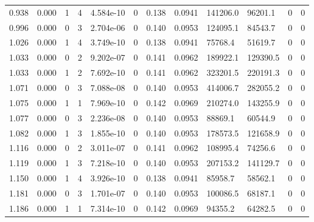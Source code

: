 \documentclass[preview]{standalone}
\begin{document}
{{\begin{tabular}{L{1.2cm}C{1.2cm} C{0.3cm}C{0.5cm} C{1.4cm}C{1.4cm} C{1.4cm}C{1.4cm} C{1.6cm}C{1.6cm} C{1.6cm}C{1.6cm}}
  0.938  &  0.000  & 1     &  4 &  4.584e-10  & 0  &  0.138&   0.0941& 141206.0 & 96201.1   &  0 & 0  \\ 
  0.996  &  0.000  & 0     &  3 &  2.704e-06  & 0  &  0.140&   0.0953& 124095.1 & 84543.7   &  0 & 0  \\ 
  1.026  &  0.000  & 1     &  4 &  3.749e-10  & 0  &  0.138&   0.0941& 75768.4 & 51619.7   &  0 & 0  \\ 
  1.033  &  0.000  & 0     &  2 &  9.202e-07  & 0  &  0.141&   0.0962& 189922.1 & 129390.5   &  0 & 0  \\ 
  1.033  &  0.000  & 1     &  2 &  7.692e-10  & 0  &  0.141&   0.0962& 323201.5 & 220191.3   &  0 & 0  \\ 
  1.071  &  0.000  & 0     &  3 &  7.088e-08  & 0  &  0.140&   0.0953& 414006.7 & 282055.2   &  0 & 0  \\ 
  1.075  &  0.000  & 1     &  1 &  7.969e-10  & 0  &  0.142&   0.0969& 210274.0 & 143255.9   &  0 & 0  \\ 
  1.077  &  0.000  & 0     &  3 &  2.236e-08  & 0  &  0.140&   0.0953& 88869.1 & 60544.9   &  0 & 0  \\ 
  1.082  &  0.000  & 1     &  3 &  1.855e-10  & 0  &  0.140&   0.0953& 178573.5 & 121658.9   &  0 & 0  \\ 
  1.116  &  0.000  & 0     &  2 &  3.011e-07  & 0  &  0.141&   0.0962& 108995.4 & 74256.6   &  0 & 0  \\ 
  1.119  &  0.000  & 1     &  3 &  7.218e-10  & 0  &  0.140&   0.0953& 207153.2 & 141129.7   &  0 & 0  \\ 
  1.150  &  0.000  & 1     &  4 &  3.926e-10  & 0  &  0.138&   0.0941& 85958.7 & 58562.1   &  0 & 0  \\ 
  1.181  &  0.000  & 0     &  3 &  1.701e-07  & 0  &  0.140&   0.0953& 100086.5 & 68187.1   &  0 & 0  \\ 
  1.186  &  0.000  & 1     &  1 &  7.314e-10  & 0  &  0.142&   0.0969& 94355.2 & 64282.5   &  0 & 0  \\ 
\hline 
\end{tabular} 

}}
\end{document}
